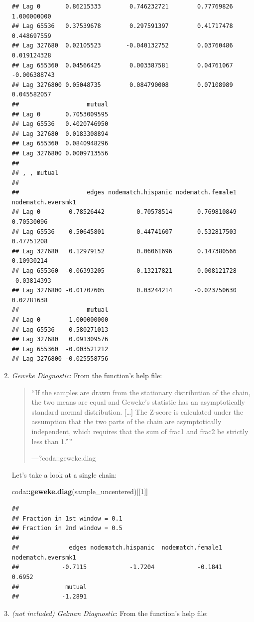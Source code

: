 \documentclass[
]{book}
\newenvironment{Shaded}{\begin{snugshade}}{\end{snugshade}}
\newcommand{\DecValTok}[1]{\textcolor[rgb]{0.00,0.00,0.81}{#1}}
\newcommand{\FunctionTok}[1]{\textcolor[rgb]{0.13,0.29,0.53}{\textbf{#1}}}
\newcommand{\NormalTok}[1]{#1}
\newcommand{\SpecialCharTok}[1]{\textcolor[rgb]{0.81,0.36,0.00}{\textbf{#1}}}
\begin{document}
\begin{enumerate}
\begin{verbatim}
## Lag 0       0.86215333        0.746232721        0.77769826        1.000000000
## Lag 65536   0.37539678        0.297591397        0.41717478        0.448697559
## Lag 327680  0.02105523       -0.040132752        0.03760486        0.019124328
## Lag 655360  0.04566425        0.003387581        0.04761067       -0.006388743
## Lag 3276800 0.05048735        0.084790008        0.07108989        0.045582057
##                   mutual
## Lag 0       0.7053009595
## Lag 65536   0.4020746950
## Lag 327680  0.0183308894
## Lag 655360  0.0840948296
## Lag 3276800 0.0009713556
## 
## , , mutual
## 
##                   edges nodematch.hispanic nodematch.female1 nodematch.eversmk1
## Lag 0        0.78526442         0.70578514       0.769810849         0.70530096
## Lag 65536    0.50645801         0.44741607       0.532817503         0.47751208
## Lag 327680   0.12979152         0.06061696       0.147380566         0.10930214
## Lag 655360  -0.06393205        -0.13217821      -0.008121728        -0.03814393
## Lag 3276800 -0.01707605         0.03244214      -0.023750630         0.02781638
##                   mutual
## Lag 0        1.000000000
## Lag 65536    0.580271013
## Lag 327680   0.091309576
## Lag 655360  -0.003521212
## Lag 3276800 -0.025558756
\end{verbatim}
\item
  \emph{Geweke Diagnostic}: From the function's help file:

  \begin{quote}
  ``If the samples are drawn from the stationary distribution of the chain, the two means are equal and Geweke's statistic has an asymptotically standard normal distribution. {[}\ldots{]}
  The Z-score is calculated under the assumption that the two parts of the chain are asymptotically independent, which requires that the sum of frac1 and frac2 be strictly less than 1.''''

  ---?coda::geweke.diag
  \end{quote}

  Let's take a look at a single chain:

\begin{Shaded}
\begin{Highlighting}[]
\NormalTok{coda}\SpecialCharTok{::}\FunctionTok{geweke.diag}\NormalTok{(sample\_uncentered)[[}\DecValTok{1}\NormalTok{]]}
\end{Highlighting}
\end{Shaded}

\begin{verbatim}
## 
## Fraction in 1st window = 0.1
## Fraction in 2nd window = 0.5 
## 
##              edges nodematch.hispanic  nodematch.female1 nodematch.eversmk1 
##            -0.7115            -1.7204            -0.1841             0.6952 
##             mutual 
##            -1.2891
\end{verbatim}
\item
  \emph{(not included) Gelman Diagnostic}: From the function's help file:


\end{enumerate}
\end{document}
